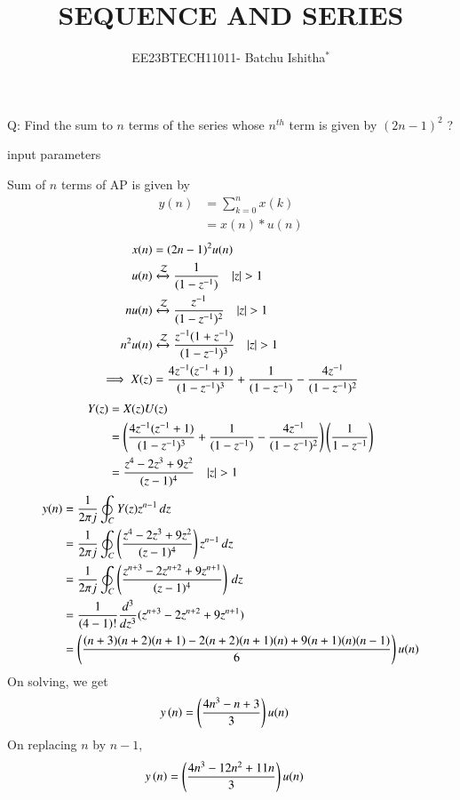 \documentclass[journal,12pt,onecolumn]{IEEEtran}
\theoremstyle{remark}
\begin{document}
\let\vec\mathbf



\title{SEQUENCE AND SERIES}
\author{EE23BTECH11011- Batchu Ishitha$^{*}$%
}
\maketitle




\bigskip

\renewcommand{\thefigure}{\theenumi}
\renewcommand{\thetable}{\theenumi}

Q: Find the sum to $n$ terms of the series whose $n^{th}$ term is given by $(2n-1)^2$ ?

\solution

\begin{table}[!ht]
    \centering
        
    \caption{input parameters}
    \label{}
\end{table}

Sum of $n$ terms of AP is given by
\begin{align}
 y(n)&=\sum_{k=0}^{n} x(k)\\
    &=x(n)*u(n)  
\end{align}
\begin{align}
x(n)&= (2n-1)^2 u(n) \\
   u(n) &\xleftrightarrow{\mathcal{Z}} \frac{1}{(1-z^{-1})}  \quad |z|>1\\
   nu(n) &\xleftrightarrow{\mathcal{Z}} \frac{z^{-1}}{(1-z^{-1})^2} \quad |z|>1\\
   n^2u(n) &\xleftrightarrow{\mathcal{Z}} \frac{z^{-1}(1+z^{-1})}{(1-z^{-1})^3} \quad |z|>1 \\
 \implies  X(z)&=\frac{4z^{-1}(z^{-1}+1)}{(1-z^{-1})^3} + \frac{1}{(1-z^{-1})} - \frac{4z^{-1}}{(1-z^{-1})^2}
\end{align}
\begin{align}
 Y(z) &= X(z)U(z) \\
 &= \brak{\frac{4z^{-1}(z^{-1}+1)}{(1-z^{-1})^3} + \frac{1}{(1-z^{-1})} - \frac{4z^{-1}}{(1-z^{-1})^2}}\brak{\frac{1}{1-z^{-1}}}\\
 &=\frac{z^4-2z^3+9z^2}{(z-1)^4} \quad |z|>1
\end{align}
\begin{align}
y(n)&=\frac{1}{2\pi j}\oint_C Y(z) z^{n-1}\, dz \\
&=\frac{1}{2\pi j}\oint_C \left(\frac{z^4-2z^3+9z^2}{(z-1)^4}\right)z^{n-1} \, dz \\
&=\frac{1}{2\pi j}\oint_C \left(\frac{z^{n+3}-2z^{n+2}+9z^{n+1}}{(z-1)^4}\right)\, dz \\
&=\frac{1}{(4-1)!}\frac{d^3}{dz^3}(z^{n+3}-2z^{n+2}+9z^{n+1}) \\ 
&=\left(\frac{(n+3)(n+2)(n+1)-2(n+2)(n+1)(n)+9(n+1)(n)(n-1)}{6}\right)u(n)
\end{align}
On solving, we get
\begin{align}
    y\left(n\right) &=\left(\frac{4n^{3}-n+3}{3}\right)u(n) 
\end{align}
On replacing $n$ by $n-1$,
\begin{align}
    y\left(n\right) &=\left(\frac{4n^{3}-12n^2+11n}{3}\right)u(n) 
\end{align}
\end{document}
